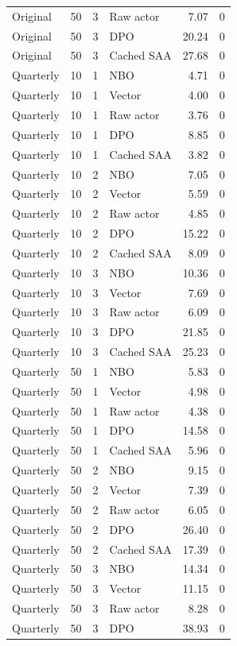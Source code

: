 \begin{longtable}{llrlrr}
Original & 50 & 3 & Raw actor & 7.07 & 0 \\
Original & 50 & 3 & DPO & 20.24 & 0 \\
Original & 50 & 3 & Cached SAA & 27.68 & 0 \\
Quarterly & 10 & 1 & NBO & 4.71 & 0 \\
Quarterly & 10 & 1 & Vector & 4.00 & 0 \\
Quarterly & 10 & 1 & Raw actor & 3.76 & 0 \\
Quarterly & 10 & 1 & DPO & 8.85 & 0 \\
Quarterly & 10 & 1 & Cached SAA & 3.82 & 0 \\
Quarterly & 10 & 2 & NBO & 7.05 & 0 \\
Quarterly & 10 & 2 & Vector & 5.59 & 0 \\
Quarterly & 10 & 2 & Raw actor & 4.85 & 0 \\
Quarterly & 10 & 2 & DPO & 15.22 & 0 \\
Quarterly & 10 & 2 & Cached SAA & 8.09 & 0 \\
Quarterly & 10 & 3 & NBO & 10.36 & 0 \\
Quarterly & 10 & 3 & Vector & 7.69 & 0 \\
Quarterly & 10 & 3 & Raw actor & 6.09 & 0 \\
Quarterly & 10 & 3 & DPO & 21.85 & 0 \\
Quarterly & 10 & 3 & Cached SAA & 25.23 & 0 \\
Quarterly & 50 & 1 & NBO & 5.83 & 0 \\
Quarterly & 50 & 1 & Vector & 4.98 & 0 \\
Quarterly & 50 & 1 & Raw actor & 4.38 & 0 \\
Quarterly & 50 & 1 & DPO & 14.58 & 0 \\
Quarterly & 50 & 1 & Cached SAA & 5.96 & 0 \\
Quarterly & 50 & 2 & NBO & 9.15 & 0 \\
Quarterly & 50 & 2 & Vector & 7.39 & 0 \\
Quarterly & 50 & 2 & Raw actor & 6.05 & 0 \\
Quarterly & 50 & 2 & DPO & 26.40 & 0 \\
Quarterly & 50 & 2 & Cached SAA & 17.39 & 0 \\
Quarterly & 50 & 3 & NBO & 14.34 & 0 \\
Quarterly & 50 & 3 & Vector & 11.15 & 0 \\
Quarterly & 50 & 3 & Raw actor & 8.28 & 0 \\
Quarterly & 50 & 3 & DPO & 38.93 & 0 \\

\end{longtable}
